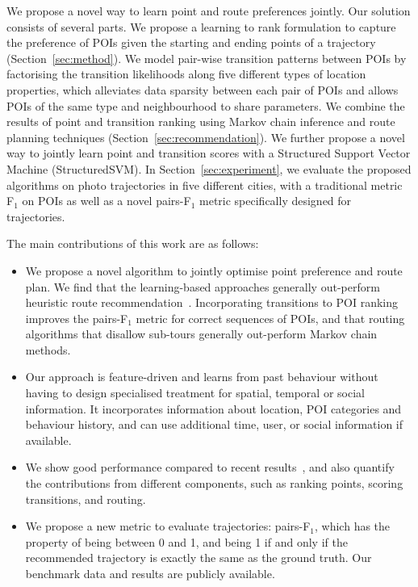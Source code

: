 We propose a novel way to learn point and route preferences jointly.
Our solution consists of several parts.
We propose a learning to rank formulation to capture the preference of POIs given the starting and ending points of a trajectory (Section~\ref{sec:method}).
We model pair-wise transition patterns between POIs by factorising the transition likelihoods along five different types of location properties,
which alleviates data sparsity between each pair of POIs and allows POIs of the same type and neighbourhood to share parameters.
We combine the results of point and transition ranking using Markov chain inference and route planning techniques (Section~\ref{sec:recommendation}). We further propose a novel way to jointly learn point and transition scores with a Structured Support Vector Machine (StructuredSVM). In Section~\ref{sec:experiment},
we evaluate the proposed algorithms on photo trajectories in five different cities, with a traditional metric F$_1$ on POIs as well as a novel pairs-F$_1$ metric specifically designed for trajectories.

The main contributions of this work are as follows:
\begin{itemize}
\setlength{\itemsep}{-2pt}
\item We propose a novel algorithm to jointly optimise point preference and route plan.
  We find that the learning-based approaches generally out-perform heuristic route recommendation~\cite{ijcai15}. Incorporating transitions to POI ranking improves the pairs-F$_1$ metric for correct sequences of POIs, and that routing algorithms that disallow sub-tours generally out-perform Markov chain methods.
\item Our approach is feature-driven and learns from past behaviour without having to design specialised treatment for spatial, temporal or social information. It incorporates information about location, POI categories and behaviour history, and can use additional time, user, or social information if available.%
\item We show good performance compared to recent results~\cite{ijcai15}, and also quantify the contributions from different components, such as ranking points, scoring transitions, and routing.
\item We propose a new metric to evaluate trajectories: pairs-F$_1$, which has the property of being between 0 and 1, and being 1 if and only if the recommended trajectory is exactly the same as the ground truth. Our benchmark data and results are publicly available.
\end{itemize}
